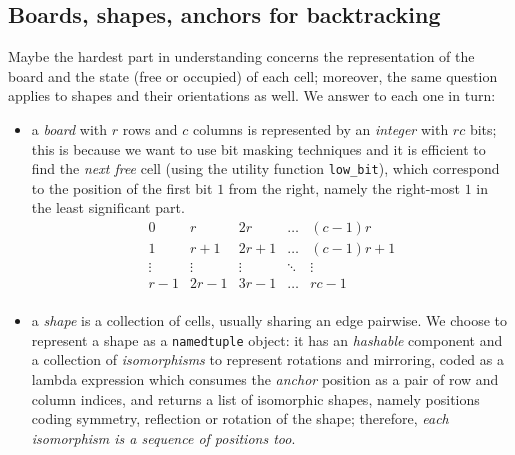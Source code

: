 \subsection{Boards, shapes, anchors for backtracking}

Maybe the hardest part in understanding concerns the representation of the board and
the state (free or occupied) of each cell; moreover, the same question applies
to shapes and their orientations as well. We answer to each one in turn:
\begin{itemize}
    \item a \textit{board} with $r$ rows and $c$ columns is represented by an
    \textit{integer} with $rc$ bits; this is because we want to use bit masking
    techniques and it is efficient to find the \textit{next free} cell (using
    the utility function \verb|low_bit|), which correspond to the position of
    the first bit $1$ from the right, namely the right-most $1$ in the least
    significant part.
    \begin{displaymath}
    \begin{array}{c|c|c|c|c}
    0 & r & 2r & \ldots & (c-1)r \\
    \hline
    1 & r+1 & 2r+1 & \ldots & (c-1)r+1 \\
    \hline
    \vdots & \vdots & \vdots & \ddots & \vdots \\
    \hline
    r-1 & 2r-1 & 3r-1 & \ldots & rc-1\\
    \end{array}
    \end{displaymath}

    \item a \textit{shape} is a collection of cells, usually sharing an edge
    pairwise. We choose to represent a shape as a \verb|namedtuple| object: it
    has an \textit{hashable} component and a collection of
    \textit{isomorphisms} to represent rotations and mirroring, coded as a
    lambda expression which consumes the \textit{anchor} position as a pair of row
    and column indices, and returns a list of isomorphic shapes, namely
    positions coding symmetry, reflection or rotation of the shape; therefore,
    \textit{each isomorphism is a sequence of positions too}.


\end{itemize}
